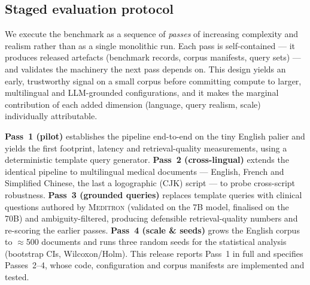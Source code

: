\documentclass[10pt,a4paper]{article}
\begin{document}
\subsection{Staged evaluation protocol}
\label{sec:stages}

We execute the benchmark as a sequence of \emph{passes} of increasing
complexity and realism rather than as a single monolithic run. Each pass is
self-contained --- it produces released artefacts (benchmark records, corpus
manifests, query sets) --- and validates the machinery the next pass depends
on. This design yields an early, trustworthy signal on a small corpus before
committing compute to larger, multilingual and LLM-grounded configurations,
and it makes the marginal contribution of each added dimension (language,
query realism, scale) individually attributable.

\begin{table}[h]
  \centering
  \caption{The four evaluation passes. Complexity grows along corpus size,
    language coverage and query realism; each pass reuses the same fixed
    pipeline and instrumentation.}
  \label{tab:stages}
\end{table}

\textbf{Pass~1 (pilot)} establishes the pipeline end-to-end on the tiny
English palier and yields the first footprint, latency and retrieval-quality
measurements, using a deterministic template query generator.
\textbf{Pass~2 (cross-lingual)} extends the identical pipeline to multilingual
medical documents --- English, French and Simplified Chinese, the last a
logographic (CJK) script --- to probe cross-script robustness.
\textbf{Pass~3 (grounded queries)} replaces template queries with clinical
questions authored by \textsc{Meditron} (validated on the 7B model, finalised
on the 70B) and ambiguity-filtered, producing defensible retrieval-quality
numbers and re-scoring the earlier passes.
\textbf{Pass~4 (scale \& seeds)} grows the English corpus to $\approx$500
documents and runs three random seeds for the statistical analysis
(bootstrap CIs, Wilcoxon/Holm). This release reports Pass~1 in full and
specifies Passes~2--4, whose code, configuration and corpus manifests are
implemented and tested.
\end{document}
